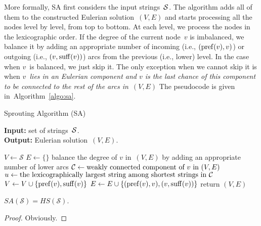 More formally, SA first considers the input strings~${\cal S}$. The algorithm adds all of them to the constructed Eulerian solution~$(V,E)$ and starts processing all the nodes level by level, from top to bottom. At each level, we process the nodes in the lexicographic order. If the degree of the current node~$v$ is imbalanced, we balance it by adding an appropriate number of incoming (i.e., $(\operatorname{pref}(v),v)$) or outgoing (i.e., $(v, \operatorname{suff}(v))$) arcs from the previous (i.e., lower) level. In the case when $v$~is balanced, we just skip it. The only exception when we cannot skip it is when {\em $v$~lies in an Eulerian component and $v$ is the last chance of this component to be connected to the rest of the arcs in~$(V,E)$} The pseudocode is given in~Algorithm~\ref{algo:sa}.

\begin{algorithm}[!ht]
    \caption{Sprouting Algorithm (SA)}\label{algo:sa}
    \hspace*{\algorithmicindent} \textbf{Input:} set of strings~${\cal S}$.\\
    \hspace*{\algorithmicindent} \textbf{Output:} Eulerian solution~$(V, E)$.
    \begin{algorithmic}[1]
        \State $V \gets \mathcal{S}$
        \State\label{alg:gha_init}$E \gets \{\}$
        \label{alg:for}
        \State\label{alg:step6} balance the degree of $v$ in~$(V,E)$ by adding an appropriate number of lower arcs
        \Else
        \State\label{alg:else} ${\cal C} \gets \text{weakly connected component of $v$ in $(V,E)$}$
        \State $u \gets \text{the lexicographically largest string among shortest strings in ${\cal C}$}$
        \State\label{alg:last1} $V \gets V \cup \{\operatorname{pref}(v), \operatorname{suff}(v)\}$
        \State\label{alg:last2} $E \gets E \cup \{(\operatorname{pref}(v), v), (v, \operatorname{suff}(v))\}$
        \EndIf
        \EndIf
        \EndFor
        \EndFor
        \State return $(V,E)$
    \end{algorithmic}
\end{algorithm}

\begin{theorem}
    $SA(\mathcal{S}) = HS(\mathcal{S})$.
\end{theorem}
\begin{proof}
    Obviously.
\end{proof}
